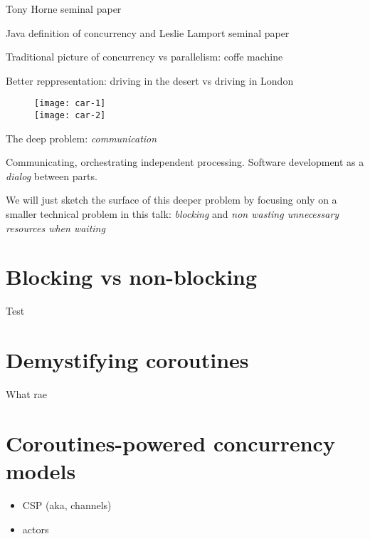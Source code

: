 \documentclass[10pt]{beamer}
\begin{document}
\begin{frame}[fragile]
Tony Horne seminal paper 
\end{frame}
\begin{frame}[fragile]
Java definition of concurrency and Leslie Lamport seminal paper 
\end{frame}
\begin{frame}[fragile]
Traditional picture of concurrency vs parallelism: coffe machine 
\end{frame}
\begin{frame}[fragile]
Better reppresentation: driving in the desert vs driving in London 
	\begin{figure}
		\centering
		\texttt{[image: car-1]}\\
		\texttt{[image: car-2]}
	\end{figure}
\end{frame}
\begin{frame}[fragile]
The deep problem: \emph{communication}

	Communicating, orchestrating independent processing. Software development as a \emph{dialog} between parts. 

	We will just sketch the surface of this deeper problem by focusing only  on a smaller technical problem in this talk: \emph{blocking} and \emph{non wasting unnecessary resources when waiting}
\end{frame}
\section{Blocking vs non-blocking}
\begin{frame}
	Test
\end{frame}
\section{Demystifying coroutines}
\begin{frame}
What rae
\end{frame}
\section{Coroutines-powered concurrency models}
\begin{frame}[fragile]
\begin{itemize}
	\item CSP (aka, channels) 
\item actors 
	\end{itemize}
\end{frame}

% 
% 
\end{document}
